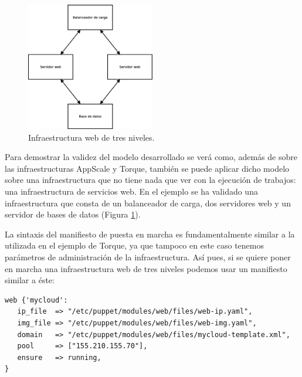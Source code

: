 \begin{figure} [!htbp]
  \centering
  \includegraphics[width=0.5\textwidth]{figuras/Arquitectura_Web2.eps}
  \caption{Infraestructura web de tres niveles.}
\label{figure:arquitectura-web}
\end{figure}

Para demostrar la validez del modelo desarrollado se verá como, además de sobre las infraestructuras AppScale y Torque, también se puede aplicar dicho modelo sobre una infraestructura que no tiene nada que ver con la ejecución de trabajos: una infraestructura de servicios web. En el ejemplo se ha validado una infraestructura que consta de un balanceador de carga, dos servidores web y un servidor de bases de datos (Figura \ref{figure:arquitectura-web}).



La sintaxis del manifiesto de puesta en marcha es fundamentalmente similar a la utilizada en el ejemplo de Torque, ya que tampoco en este caso tenemos parámetros de administración de la infraestructura. Así pues, si se quiere poner en marcha una infraestructura web de tres niveles podemos usar un manifiesto similar a éste:

\begin{lstlisting}
web {'mycloud':
   ip_file  => "/etc/puppet/modules/web/files/web-ip.yaml",
   img_file => "/etc/puppet/modules/web/files/web-img.yaml",
   domain   => "/etc/puppet/modules/web/files/mycloud-template.xml",
   pool     => ["155.210.155.70"],
   ensure   => running,
}
\end{lstlisting}

